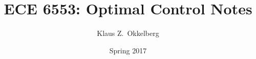 \documentclass[letterpaper,12pt,titlepage]{report}
\theoremstyle{plain}
\theoremstyle{definition}
\begin{document}
\hypersetup{pageanchor=false}
\title{ECE 6553: Optimal Control Notes}
\author{Klaus Z.\ Okkelberg}
\date{Spring 2017}
\maketitle

\hypersetup{pageanchor=true}

\tableofcontents






\end{document}
